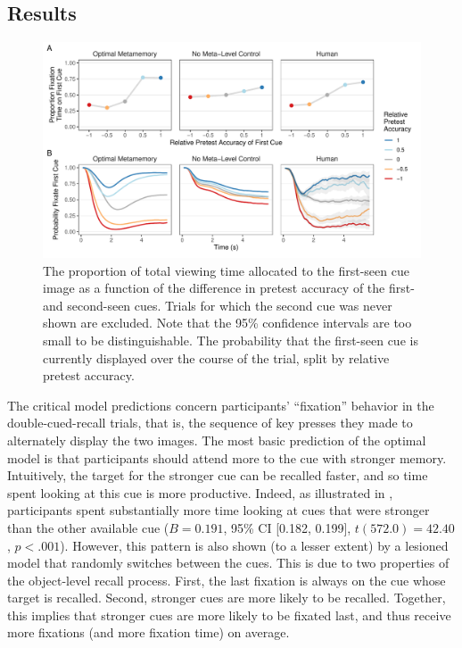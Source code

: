\subsection{Results}


\begin{figure}[t!]
  \centering
  \includegraphics[scale=.65]{figs/memory/exp2/overall_timecourse.pdf}
  \caption{
     The proportion of total viewing time allocated to the first-seen cue image as a function of the difference in pretest accuracy of the first- and second-seen cues. Trials for which the second cue was never shown are excluded. Note that the 95\% confidence intervals are too small to be distinguishable.
     The probability that the first-seen cue is currently displayed over the course of the trial, split by relative pretest accuracy.
  \label{fig:timecourse}
  }
\end{figure}

The critical model predictions concern participants' ``fixation'' behavior in the double-cued-recall trials, that is, the sequence of key presses they made to alternately display the two images. The most basic prediction of the optimal model is that participants should attend more to the cue with stronger memory. Intuitively, the target for the stronger cue can be recalled faster, and so time spent looking at this cue is more productive. Indeed, as illustrated in , participants spent substantially more time looking at cues that were stronger than the other available cue ($B = 0.191$, 95\% CI [0.182, 0.199], $t(572.0)=42.40$, $p < .001$). However, this pattern is also shown (to a lesser extent) by a lesioned model that randomly switches between the cues. This is due to two properties of the object-level recall process. First, the last fixation is always on the cue whose target is recalled. Second, stronger cues are more likely to be recalled. Together, this implies that stronger cues are more likely to be fixated last, and thus receive more fixations (and more fixation time) on average.


